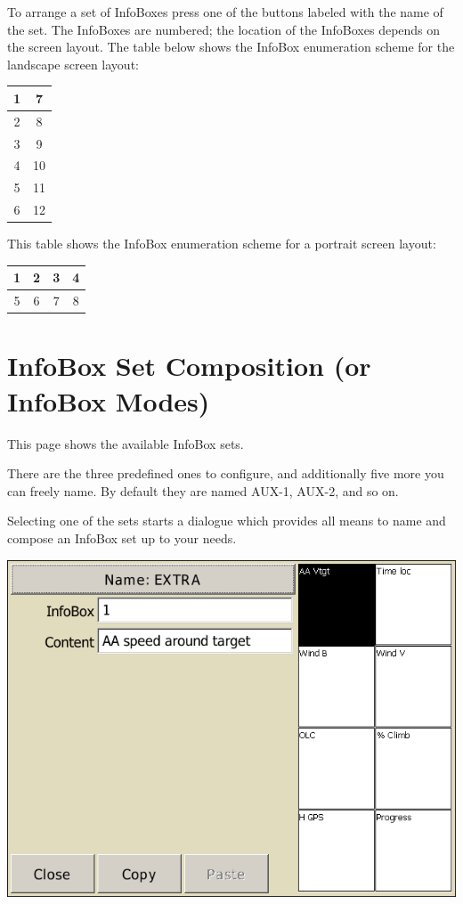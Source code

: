 To arrange a set of InfoBoxes press one of the buttons labeled with the name
of the set.  The InfoBoxes are numbered; the location of the InfoBoxes depends
on the screen layout.  The table below shows the InfoBox enumeration scheme for the landscape screen layout:

\begin{tabular}{|c|c|}
\hline
1 & 7 \\
\hline
2 & 8 \\
\hline
3 & 9 \\
\hline
4 & 10 \\
\hline
5 & 11 \\
\hline
6 & 12 \\
\hline
\end{tabular}

This table shows the InfoBox enumeration scheme for a portrait screen layout:

\begin{tabular}{|c|c|c|c|}
\hline
1 & 2 & 3 & 4 \\
\hline
\hline
5 & 6 & 7 & 8 \\
\hline
\end{tabular}


\clearpage
\section{InfoBox Set Composition (or InfoBox Modes)}\label{sec:infobox_sets}

This page shows the available InfoBox sets.

There are the three predefined ones to configure, and additionally five more you can freely name. By default they are named AUX-1, AUX-2, and so on.

Selecting one of the sets starts a dialogue which provides all means to name and compose an InfoBox set up to your needs.

\begin{center}
\includegraphics[angle=0,width=0.8\linewidth,keepaspectratio='true']{figures/config-infoboxes.png}
\end{center}

